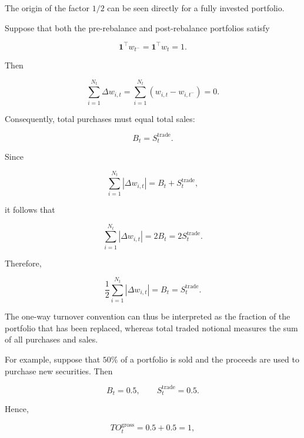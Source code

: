 \documentclass[11pt,a4paper]{article}
\begin{document}
The origin of the factor $1/2$ can be seen directly for a fully invested
portfolio.

Suppose that both the pre-rebalance and post-rebalance portfolios satisfy

\begin{equation}
\mathbf{1}^{\top}w_{t^-}
=
\mathbf{1}^{\top}w_t
=
1.
\end{equation}

Then

\begin{equation}
\sum_{i=1}^{N_t}\Delta w_{i,t}
=
\sum_{i=1}^{N_t}
\left(
w_{i,t}-w_{i,t^-}
\right)
=
0.
\end{equation}

Consequently, total purchases must equal total sales:

\begin{equation}
B_t
=
S_t^{\mathrm{trade}}.
\end{equation}

Since

\begin{equation}
\sum_{i=1}^{N_t}
|\Delta w_{i,t}|
=
B_t+S_t^{\mathrm{trade}},
\end{equation}

it follows that

\begin{equation}
\sum_{i=1}^{N_t}
|\Delta w_{i,t}|
=
2B_t
=
2S_t^{\mathrm{trade}}.
\end{equation}

Therefore,

\begin{equation}
\boxed{
\frac{1}{2}
\sum_{i=1}^{N_t}
|\Delta w_{i,t}|
=
B_t
=
S_t^{\mathrm{trade}}.
}
\end{equation}

The one-way turnover convention can thus be interpreted as the fraction of the
portfolio that has been replaced, whereas total traded notional measures the
sum of all purchases and sales.

For example, suppose that $50\%$ of a portfolio is sold and the proceeds are
used to purchase new securities. Then

\begin{equation}
B_t=0.5,
\qquad
S_t^{\mathrm{trade}}=0.5.
\end{equation}

Hence,

\begin{equation}
TO_t^{\mathrm{gross}}
=
0.5+0.5
=
1,
\end{equation}
\end{document}
